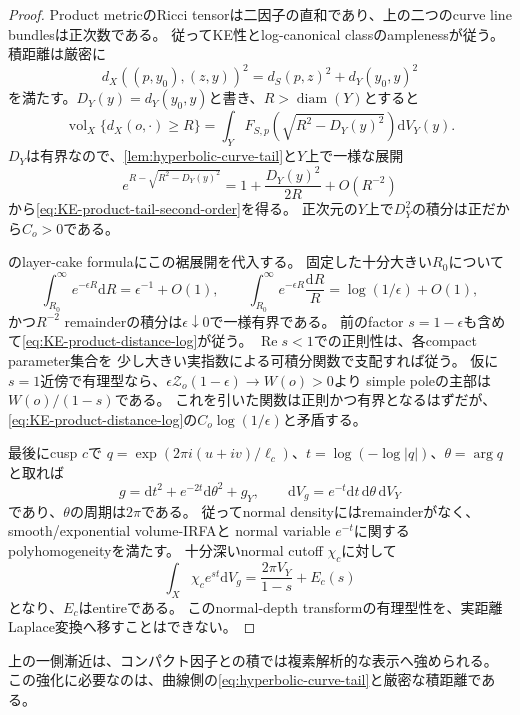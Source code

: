 \documentclass[11pt,a4paper]{ltjsarticle}
\newcommand{\dd}{\mathrm d}
\newcommand{\vol}{\operatorname{vol}}
\newcommand{\diam}{\operatorname{diam}}
\theoremstyle{plain}
\theoremstyle{definition}
\theoremstyle{remark}
\begin{document}
\begin{proof}
Product metricのRicci tensorは二因子の直和であり、上の二つのcurve line bundlesは正次数である。
従ってKE性とlog-canonical classのamplenessが従う。
積距離は厳密に
\[
 d_X((p,y_0),(z,y))^2=d_S(p,z)^2+d_Y(y_0,y)^2
\]
を満たす。$D_Y(y)=d_Y(y_0,y)$と書き、$R>\diam(Y)$とすると
\[
 \vol_X\{d_X(o,\cdot)\ge R\}
 =\int_Y F_{S,p}\!\left(\sqrt{R^2-D_Y(y)^2}\right)\dd V_Y(y).
\]
$D_Y$は有界なので、\cref{lem:hyperbolic-curve-tail}と$Y$上で一様な展開
\[
 e^{R-\sqrt{R^2-D_Y(y)^2}}
 =1+\frac{D_Y(y)^2}{2R}+O(R^{-2})
\]
から\eqref{eq:KE-product-tail-second-order}を得る。
正次元の$Y$上で$D_Y^2$の積分は正だから$C_o>0$である。

のlayer-cake formulaにこの裾展開を代入する。
固定した十分大きい$R_0$について
\[
 \int_{R_0}^\infty e^{-\epsilon R}\dd R
 =\epsilon^{-1}+O(1),\qquad
 \int_{R_0}^\infty e^{-\epsilon R}\frac{\dd R}{R}
 =\log(1/\epsilon)+O(1),
\]
かつ$R^{-2}$ remainderの積分は$\epsilon\downarrow0$で一様有界である。
前のfactor $s=1-\epsilon$も含めて\eqref{eq:KE-product-distance-log}が従う。
$\operatorname{Re}s<1$での正則性は、各compact parameter集合を
少し大きい実指数による可積分関数で支配すれば従う。
仮に$s=1$近傍で有理型なら、$\epsilon\mathcal Z_o(1-\epsilon)\to W(o)>0$より
simple poleの主部は$W(o)/(1-s)$である。
これを引いた関数は正則かつ有界となるはずだが、
\eqref{eq:KE-product-distance-log}の$C_o\log(1/\epsilon)$と矛盾する。

最後にcusp $c$で
$q=\exp(2\pi i(u+iv)/\ell_c)$、$t=\log(-\log|q|)$、$\theta=\arg q$と取れば
\[
 g=\dd t^2+e^{-2t}\dd\theta^2+g_Y,\qquad
 \dd V_g=e^{-t}\dd t\,\dd\theta\,\dd V_Y
\]
であり、$\theta$の周期は$2\pi$である。
従ってnormal densityにはremainderがなく、smooth/exponential volume-IRFAと
normal variable $e^{-t}$に関するpolyhomogeneityを満たす。
十分深いnormal cutoff $\chi_c$に対して
\[
 \int_X\chi_c e^{st}\dd V_g
 =\frac{2\pi V_Y}{1-s}+E_c(s)
\]
となり、$E_c$はentireである。
このnormal-depth transformの有理型性を、実距離Laplace変換へ移すことはできない。
\end{proof}

上の一側漸近は、コンパクト因子との積では複素解析的な表示へ強められる。
この強化に必要なのは、曲線側の\eqref{eq:hyperbolic-curve-tail}と厳密な積距離である。
\end{document}
